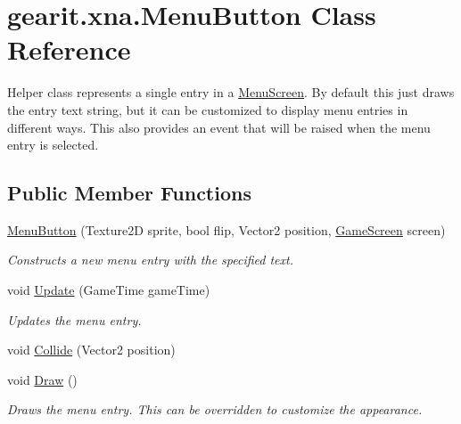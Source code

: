 \hypertarget{classgearit_1_1xna_1_1_menu_button}{\section{gearit.\+xna.\+Menu\+Button Class Reference}
\label{classgearit_1_1xna_1_1_menu_button}
}


Helper class represents a single entry in a \hyperlink{classgearit_1_1xna_1_1_menu_screen}{Menu\+Screen}. By default this just draws the entry text string, but it can be customized to display menu entries in different ways. This also provides an event that will be raised when the menu entry is selected.  


\subsection*{Public Member Functions}
\begin{DoxyCompactItemize}
\item 
\hyperlink{classgearit_1_1xna_1_1_menu_button_ab36d63726bf7362b58754c6d0b7f4a25}{Menu\+Button} (Texture2\+D sprite, bool flip, Vector2 position, \hyperlink{classgearit_1_1xna_1_1_game_screen}{Game\+Screen} screen)
\begin{DoxyCompactList}\small\item\em Constructs a new menu entry with the specified text. \end{DoxyCompactList}\item 
void \hyperlink{classgearit_1_1xna_1_1_menu_button_af05062d643126a63d46c4a6856d14152}{Update} (Game\+Time game\+Time)
\begin{DoxyCompactList}\small\item\em Updates the menu entry. \end{DoxyCompactList}\item 
void \hyperlink{classgearit_1_1xna_1_1_menu_button_a0f195697e745366caa2ed471ec95c1d2}{Collide} (Vector2 position)
\item 
void \hyperlink{classgearit_1_1xna_1_1_menu_button_afe9b4acda979e6359de82f6183068bc4}{Draw} ()
\begin{DoxyCompactList}\small\item\em Draws the menu entry. This can be overridden to customize the appearance. \end{DoxyCompactList}\end{DoxyCompactItemize}
